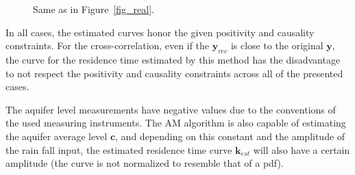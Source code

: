 \documentclass[]{elsarticle} %
\begin{document}
\begin{figure}[H]
    \centering
    \caption{Same as in Figure~\ref{fig_real}.}
    \label{fig_real_2}
\end{figure}

In all cases, the estimated curves honor the given positivity and causality constraints. For the cross-correlation, even if the $\textbf {y}_{rec}$ is close to the original $\textbf{y}$, the curve for the residence time estimated by this method has the disadvantage to not respect the positivity and causality constraints across all of the presented cases.

The aquifer level measurements have negative values due to the conventions of the used measuring instruments. The AM algorithm is also capable of estimating the aquifer average level $\textbf{c}$, and depending on this constant and the amplitude of the rain fall input, the estimated residence time curve $\textbf{k}_{est}$ will also have a certain amplitude (the curve is not normalized to resemble that of a pdf).
\end{document}
